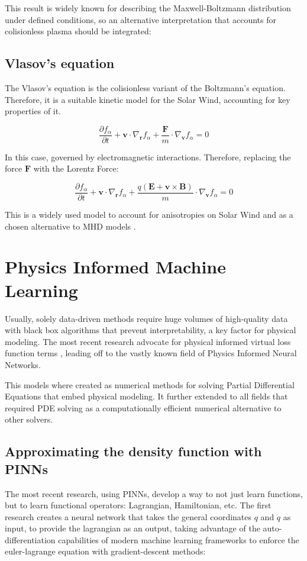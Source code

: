 \documentclass[12pt]{article}
\begin{document}
This result is widely known for describing the Maxwell-Boltzmann distribution under defined conditions, so an alternative interpretation that accounts for colisionless plasma should be integrated:

\subsection{Vlasov's equation}
The Vlasov's equation is the colisionless variant of the Boltzmann's equation. Therefore, it is a  suitable kinetic model for the Solar Wind, accounting for key properties of it.

\begin{equation}
    \frac{\partial f_{\alpha}}{\partial t} + \mathbf{v} \cdot \nabla_{\mathbf{r}}  f_{\alpha} + \frac{\mathbf{F}}{m} \cdot \nabla_{\mathbf{v}} f_\alpha = 0
\end{equation}

In this case, governed by electromagnetic interactions. Therefore, replacing the force $\mathbf{F}$ with the Lorentz Force:

\begin{equation}
    \frac{\partial f_{\alpha}}{\partial t} + \mathbf{v} \cdot \nabla_{\mathbf{r}}  f_{\alpha} + \frac{q (\mathbf{E} + \mathbf{v} \times \mathbf{B})}{m} \cdot \nabla_{\mathbf{v}} f_\alpha = 0
\end{equation}

This is a widely used model to account for anisotropies on Solar Wind \cite{Verscharen_2016} and as a chosen alternative to MHD models \cite{grandin2023hybridvlasovsimulationsoftxray}.

\section{Physics Informed Machine Learning}
Usually, solely data-driven methods require huge volumes of high-quality data with black box algorithms that prevent interpretability, a key factor for physical modeling. The most recent research advocate for physical informed virtual loss function terms \cite{}, leading off to the vastly known field of Physics Informed Neural Networks.

This models where created as numerical methods for solving Partial Differential Equations that embed physical modeling. It further extended to all fields that required PDE solving as a computationally efficient numerical alternative to other solvers.


\subsection{Approximating the density function with PINNs}
The most recent research, using PINNs, develop a way to not just learn functions, but to learn functional operators: Lagrangian, Hamiltonian, etc. \cite{cranmer2020lagrangianneuralnetworks, greydanus2019hamiltonianneuralnetworks} The first research creates a neural network that takes the general coordinates $q$ and $\dot q$ as input, to provide the lagrangian as an output, taking advantage of the auto-differentiation capabilities of modern machine learning frameworks to enforce the euler-lagrange equation with gradient-descent methods:
\end{document}
